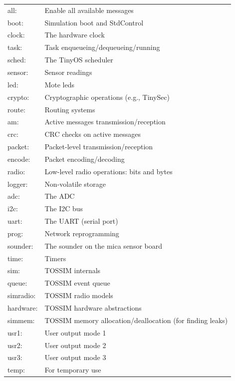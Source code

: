 \documentclass[10pt,fleqn]{article}
\def\sim{TOSSIM\xspace}
\begin{document}
\scriptsize
\vspace{0.2in}
\begin{tabular}{ll}
all:      & Enable all available messages \\
boot:     & Simulation boot and StdControl\\
clock:    & The hardware clock\\
task:     & Task enqueueing/dequeueing/running\\
sched:    & The TinyOS scheduler\\
sensor:   & Sensor readings \\
led:      & Mote leds\\
crypto:   & Cryptographic operations (e.g., TinySec)\\
route:    & Routing systems\\
am:       & Active messages transmission/reception\\
crc:      & CRC checks on active messages\\
packet:   & Packet-level transmission/reception\\
encode:   & Packet encoding/decoding\\
radio:    & Low-level radio operations: bits and bytes\\
logger:   & Non-volatile storage\\
adc:      & The ADC \\
i2c:      & The I2C bus\\
uart:     & The UART (serial port)\\
prog:     & Network reprogramming\\
sounder:  & The sounder on the mica sensor board\\
time:     & Timers\\
sim:      & \sim internals\\
queue:    & \sim event queue\\
simradio: & \sim radio models\\
hardware: & \sim hardware abstractions\\
simmem:   & \sim memory allocation/deallocation (for finding leaks)\\
usr1:     & User output mode 1\\
usr2:     & User output mode 2\\
usr3:     & User output mode 3\\
temp:     & For temporary use\\
\end{tabular}
\vspace{0.2in}
\normalsize
\end{document}
